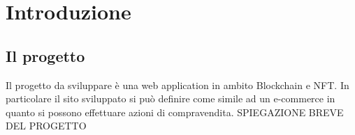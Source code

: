 \chapter{Introduzione}

\section{Il progetto}

Il progetto da sviluppare è una web application in ambito Blockchain e NFT. In particolare il sito sviluppato si può definire come simile ad un e-commerce in quanto si possono effettuare azioni di compravendita.
SPIEGAZIONE BREVE DEL PROGETTO